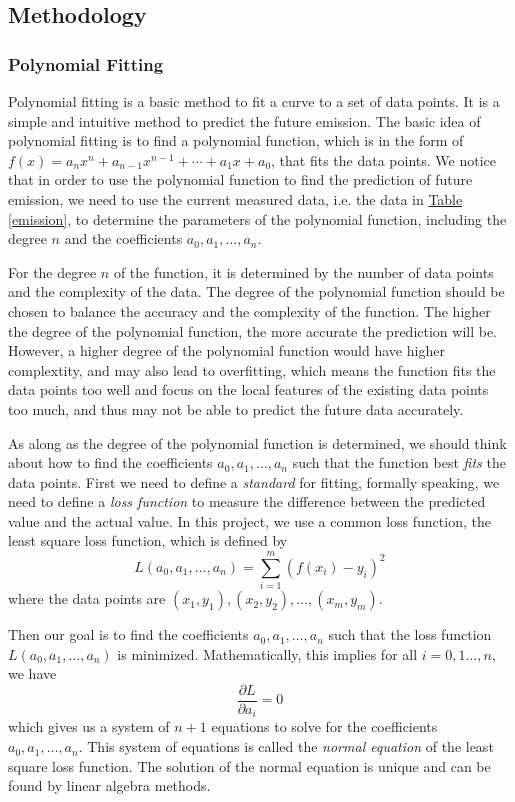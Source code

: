 \documentclass[12pt,a4paper]{article}
\begin{document}
    \subsection{Methodology}
    \subsubsection{Polynomial Fitting}
    Polynomial fitting is a basic method to fit a curve to a set of data points. It is a simple and intuitive method to predict the future  emission. The basic idea of polynomial fitting is to find a polynomial function, which is in the form of $f(x)=a_nx^n+a_{n-1}x^{n-1}+\cdots+a_1x+a_0$, that fits the data points. We notice that in order to use the polynomial function to find the prediction of future emission, we need to use the current measured data, i.e. the data in \hyperref[emission]{Table \ref*{emission}}, to determine the parameters of the polynomial function, including the degree $n$ and the coefficients $a_0,a_1,\dots,a_n$.

    For the degree $n$ of the function, it is determined by the number of data points and the complexity of the data. The degree of the polynomial function should be chosen to balance the accuracy and the complexity of the function. The higher the degree of the polynomial function, the more accurate the prediction will be. However, a higher degree of the polynomial function would have higher complextity, and may also lead to overfitting, which means the function fits the data points too well and focus on the local features of the existing data points too much, and thus may not be able to predict the future data accurately.

    As along as the degree of the polynomial function is determined, we should think about how to find the coefficients $a_0,a_1,\dots,a_n$ such that the function best \textit{fits} the data points. First we need to define a \textit{standard} for fitting, formally speaking, we need to define a \textit{loss function} to measure the difference between the predicted value and the actual value. In this project, we use a common loss function, the least square loss function, which is defined by
    \begin{equation}
        L(a_0,a_1,\dots,a_n)=\sum_{i=1}^m(f(x_i)-y_i)^2
    \end{equation}
    where the data points are $(x_1,y_1),(x_2,y_2),\dots,(x_m,y_m)$.

    Then our goal is to find the coefficients $a_0,a_1,\dots,a_n$ such that the loss function $L(a_0,a_1,\dots,a_n)$ is minimized. Mathematically, this implies for all $i=0,1\dots,n$, we have
    \begin{equation}
        \frac{\partial L}{\partial a_i}=0
    \end{equation}
    which gives us a system of $n+1$ equations to solve for the coefficients $a_0,a_1,\dots,a_n$. This system of equations is called the \textit{normal equation} of the least square loss function. The solution of the normal equation is unique and can be found by linear algebra methods.
    
\end{document}
